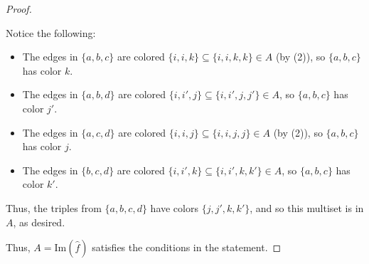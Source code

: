 \documentclass[10pt,a4paper]{amsart}
\begin{document}
\begin{proof}
\begin{enumerate}
\begin{center}
\begin{tikzpicture}
        \end{tikzpicture}
        \end{center}

        Notice the following:
        \begin{itemize}
            \item The edges in $\{a,b,c\}$ are colored $\{i, i , k\} \subseteq \{i, i, k, k\} \in A$ (by (2)), so $\{a,b,c\}$ has color $k$.
            \item The edges in $\{a,b,d\}$ are colored $\{i, i', j\} \subseteq \{i, i', j, j'\} \in A$, so $\{a,b,c\}$ has color $j'$.
            \item The edges in $\{a,c,d\}$ are colored $\{i, i , j\} \subseteq \{i, i, j, j\} \in A$ (by (2)), so $\{a,b,c\}$ has color $j$.
            \item The edges in $\{b,c,d\}$ are colored $\{i, i' , k\} \subseteq \{i, i', k, k'\} \in A$, so $\{a,b,c\}$ has color $k'$.
        \end{itemize}
        Thus, the triples from $\{a, b, c, d\}$ have colors $\{j, j', k, k'\}$, and so this multiset is in $A$, as desired.
    \end{enumerate}
    Thus, $A = \textrm{Im}(\hat f)$ satisfies the conditions in the statement.
\end{proof}
\end{document}
